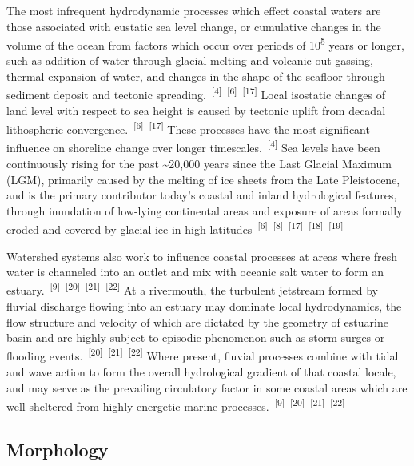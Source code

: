 \documentclass{article}
\begin{document}
\par{The most infrequent hydrodynamic processes which effect coastal waters are those associated with eustatic sea level change, or cumulative changes in the volume of the ocean from factors which occur over periods of 10\textsuperscript{5} years or longer, such as addition of water through glacial melting and volcanic out-gassing, thermal expansion of water, and changes in the shape of the seafloor through sediment deposit and tectonic spreading.~\textsuperscript{[4]}~\textsuperscript{[6]}~\textsuperscript{[17]} Local isostatic changes of land level with respect to sea height is caused by tectonic uplift from decadal lithospheric convergence.~\textsuperscript{[6]}~\textsuperscript{[17]} These processes have the most significant influence on shoreline change over longer timescales.~\textsuperscript{[4]} Sea levels have been continuously rising for the past \textasciitilde20,000 years since the Last Glacial Maximum (LGM), primarily caused by the melting of ice sheets from the Late Pleistocene, and is the primary contributor today's coastal and inland hydrological features, through inundation of low-lying continental areas and exposure of areas formally eroded and covered by glacial ice in high latitudes~\textsuperscript{[6]}~\textsuperscript{[8]}~\textsuperscript{[17]}~\textsuperscript{[18]}~\textsuperscript{[19]}}

\par{Watershed systems also work to influence coastal processes at areas where fresh water is channeled into an outlet and mix with oceanic salt water to form an estuary.~\textsuperscript{[9]}~\textsuperscript{[20]}~\textsuperscript{[21]}~\textsuperscript{[22]} At a rivermouth, the turbulent jetstream formed by fluvial discharge flowing into an estuary may dominate local hydrodynamics, the flow structure and velocity of which are dictated by the geometry of estuarine basin and are highly subject to episodic phenomenon such as storm surges or flooding events.~\textsuperscript{[20]}~\textsuperscript{[21]}~\textsuperscript{[22]} Where present, fluvial processes combine with tidal and wave action to form the overall hydrological gradient of that coastal locale, and may serve as the prevailing circulatory factor in some coastal areas which are well-sheltered from highly energetic marine processes.~\textsuperscript{[9]}~\textsuperscript{[20]}~\textsuperscript{[21]}~\textsuperscript{[22]}}

\subsection{Morphology}
\end{document}
